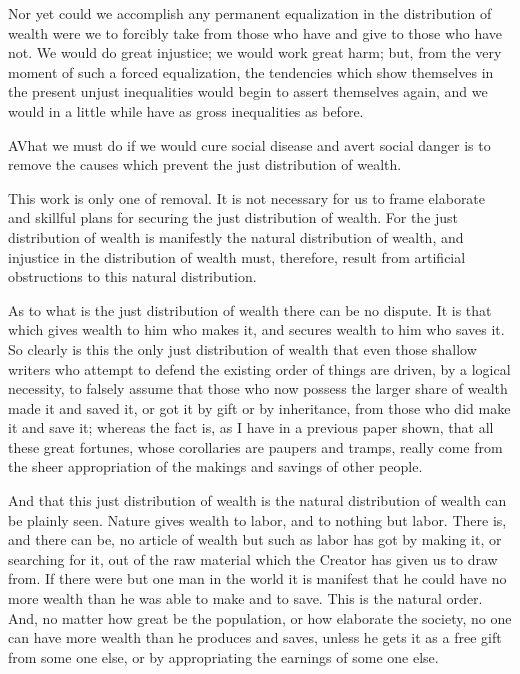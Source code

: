 \documentclass{book}
\begin{document}
Nor yet could we accomplish any permanent equalization in the distribution of wealth were we to forcibly take from those who have and give to those who have not. We would do great injustice; we would work great harm; but, from the very moment of such a forced equalization, the tendencies which show themselves in the present unjust inequalities would begin to assert themselves again, and we would in a little while have as gross inequalities as before.

AVhat we must do if we would cure social disease and avert social danger is to remove the causes which prevent the just distribution of wealth.

This work is only one of removal. It is not necessary for us to frame elaborate and skillful plans for securing the just distribution of wealth. For the just distribution of wealth is manifestly the natural distribution of wealth, and injustice in the distribution of wealth must, therefore, result from artificial obstructions to this natural distribution.

As to what is the just distribution of wealth there can be no dispute. It is that which gives wealth to him who makes it, and secures wealth to him who saves it. So clearly is this the only just distribution of wealth that even those shallow writers who attempt to defend the existing order of things are driven, by a logical necessity, to falsely assume that those who now possess the larger share of wealth made it and saved it, or got it by gift or by inheritance, from those who did make it and save it; whereas the fact is, as I have in a previous paper shown, that all these great fortunes, whose corollaries are paupers and tramps, really come from the sheer appropriation of the makings and savings of other people.

And that this just distribution of wealth is the natural distribution of wealth can be plainly seen. Nature gives wealth to labor, and to nothing but labor. There is, and there can be, no article of wealth but such as labor has got by making it, or searching for it, out of the raw material which the Creator has given us to draw from. If there were but one man in the world it is manifest that he could have no more wealth than he was able to make and to save. This is the natural order. And, no matter how great be the population, or how elaborate the society, no one can have more wealth than he produces and saves, unless he gets it as a free gift from some one else, or by appropriating the earnings of some one else.
\end{document}
